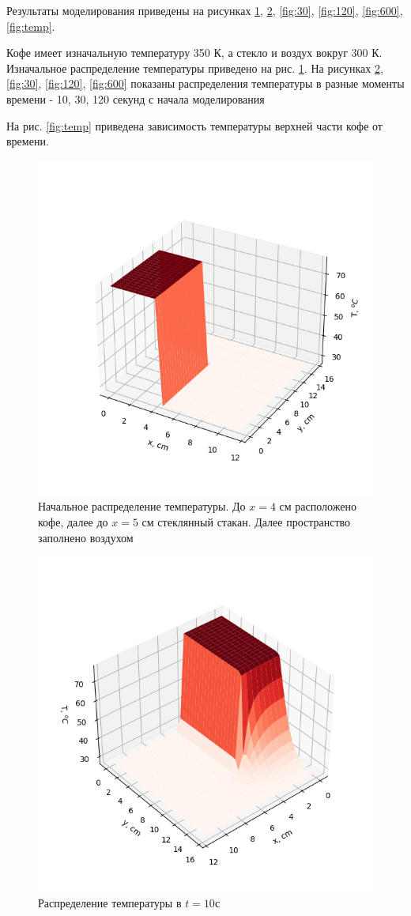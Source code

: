 Результаты моделирования приведены на рисунках
\ref{fig:init}, \ref{fig:10}, \ref{fig:30}, \ref{fig:120}, \ref{fig:600}, \ref{fig:temp}.

Кофе имеет изначальную температуру 350 К, а стекло и воздух вокруг 300 К.
Изначальное распределение температуры приведено на рис. \ref{fig:init}. На рисунках \ref{fig:10}, \ref{fig:30}, \ref{fig:120}, \ref{fig:600} показаны распределения 
температуры в разные моменты времени - 10, 30, 120 секунд с начала моделирования

На рис. \ref{fig:temp} приведена зависимость температуры верхней части кофе от времени.

\begin{figure}[H]
	\center
	\includegraphics[width=.6\linewidth]{imgs_11/init.png}
	\caption{Начальное распределение температуры. До $x=4$ см расположено кофе, далее до $x=5$ см стеклянный стакан.
	Далее пространство заполнено воздухом}
	\label{fig:init}
\end{figure}
\begin{figure}[H]
	\center
	\includegraphics[width=.6\linewidth]{imgs_11/10s.png}
	\caption{Распределение температуры в $t=10$с}
	\label{fig:10}
\end{figure}
